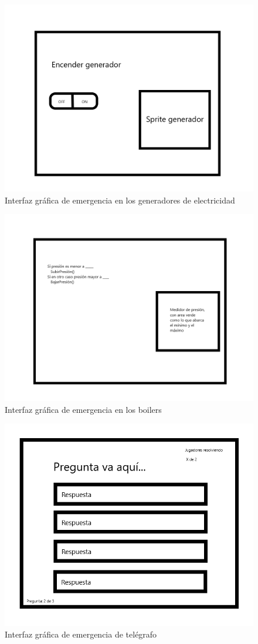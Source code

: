     \begin{figure}[H]
        \centering
        \includegraphics[width=0.5\linewidth]{images/SabotageGenerador.png}
        \caption{Interfaz gráfica de emergencia en los generadores de electricidad}
        \label{fig:ui_sab_generador}
    \end{figure}
        \begin{figure}[H]
        \centering
        \includegraphics[width=0.5\linewidth]{images/SabotagePresion.png}
        \caption{Interfaz gráfica de emergencia en los boilers}
        \label{fig:ui_sab_presion}
    \end{figure}
        \begin{figure}[H]
        \centering
        \includegraphics[width=0.5\linewidth]{images/sabotage_preguntas.png}
        \caption{Interfaz gráfica de emergencia de telégrafo}
        \label{fig:ui_teletransporte}
    \end{figure}


